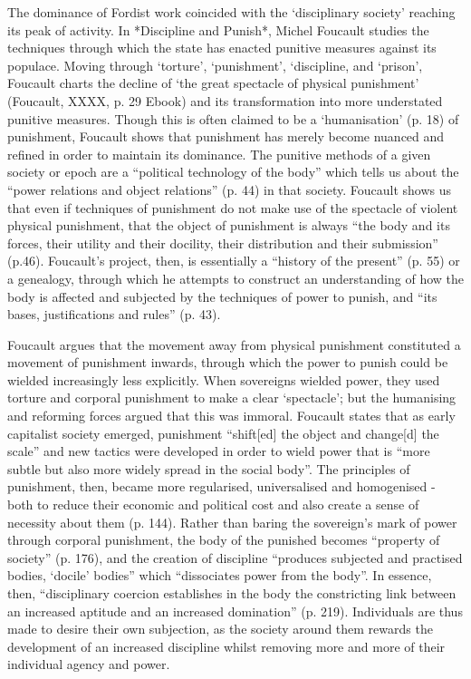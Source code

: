 The dominance of Fordist work coincided with the `disciplinary society'
reaching its peak of activity. In *Discipline and Punish*, Michel
Foucault studies the techniques through which the state has enacted
punitive measures against its populace. Moving through `torture',
`punishment', `discipline, and `prison', Foucault charts the decline of
`the great spectacle of physical punishment' (Foucault, XXXX, p. 29
Ebook) and its transformation into more understated punitive measures.
Though this is often claimed to be a `humanisation' (p. 18) of
punishment, Foucault shows that punishment has merely become nuanced and
refined in order to maintain its dominance. The punitive methods of a
given society or epoch are a ``political technology of the body'' which
tells us about the ``power relations and object relations'' (p. 44) in
that society. Foucault shows us that even if techniques of punishment do
not make use of the spectacle of violent physical punishment, that the
object of punishment is always ``the body and its forces, their utility
and their docility, their distribution and their submission'' (p.46).
Foucault's project, then, is essentially a ``history of the present''
(p. 55) or a genealogy, through which he attempts to construct an
understanding of how the body is affected and subjected by the
techniques of power to punish, and ``its bases, justifications and
rules'' (p. 43).

Foucault argues that the movement away from physical punishment
constituted a movement of punishment inwards, through which the power to
punish could be wielded increasingly less explicitly. When sovereigns
wielded power, they used torture and corporal punishment to make a clear
`spectacle'; but the humanising and reforming forces argued that this
was immoral. Foucault states that as early capitalist society emerged,
punishment ``shift{[}ed{]} the object and change{[}d{]} the scale'' and
new tactics were developed in order to wield power that is ``more subtle
but also more widely spread in the social body''. The principles of
punishment, then, became more regularised, universalised and homogenised
- both to reduce their economic and political cost and also create a
sense of necessity about them (p. 144). Rather than baring the
sovereign's mark of power through corporal punishment, the body of the
punished becomes ``property of society'' (p. 176), and the creation of
discipline ``produces subjected and practised bodies, `docile' bodies''
which ``dissociates power from the body''. In essence, then,
``disciplinary coercion establishes in the body the constricting link
between an increased aptitude and an increased domination'' (p. 219).
Individuals are thus made to desire their own subjection, as the society
around them rewards the development of an increased discipline whilst
removing more and more of their individual agency and power.

